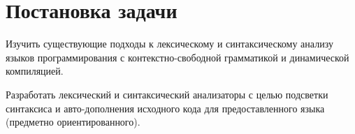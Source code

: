 \chapter{Постановка задачи} \label{chapt2}

Изучить существующие подходы к лексическому и синтаксическому анализу языков программирования с контекстно-свободной грамматикой и динамической компиляцией. 

Разработать лексический и синтаксический анализаторы с целью подсветки синтаксиса и авто-дополнения исходного кода для предоставленного языка (предметно ориентированного).